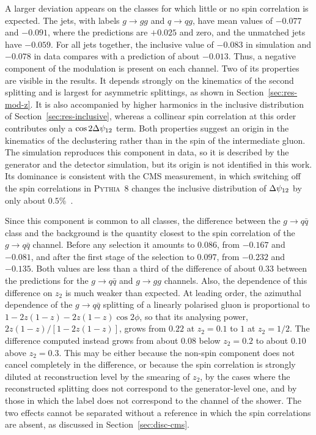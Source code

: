A larger deviation appears on the classes for which little or no spin correlation is expected.
The jets, with labels $g \to gg$ and $q \to qg$, have mean values of
$-0.077$ and $-0.091$, where the predictions are $+0.025$ and zero, and the
unmatched jets have $-0.059$. For all jets together, the inclusive value of
$-0.083$ in simulation and $-0.078$ in data compares with a prediction of about
$-0.013$. Thus, a negative component of the modulation is present on each channel.
Two of its properties are visible in the results.
It depends strongly on the kinematics of the second splitting and is largest for
asymmetric splittings, as shown in Section~\ref{sec:res-mod-z}. It is also
accompanied by higher harmonics in the inclusive distribution of
Section~\ref{sec:res-inclusive}, whereas a collinear spin correlation at this
order contributes only a $\cos 2\Delta\psi_{12}$ term. Both properties suggest an origin in
the kinematics of the declustering rather than in the spin of the intermediate
gluon. The simulation reproduces this component in data, so it is described by the
generator and the detector simulation, but its origin is not identified in this
work. Its dominance is consistent with the CMS measurement, in which switching off the
spin correlations in \textsc{Pythia}~8 changes the inclusive distribution of
$\Delta\psi_{12}$ by only about $0.5\%$~\cite{CMS:2026jnt}.

Since this component is common to all classes, the difference between the
$g \to q\bar{q}$ class and the background is the quantity closest to the spin
correlation of the $g \to q\bar{q}$ channel. Before any selection it amounts to
$0.086$, from $-0.167$ and $-0.081$, and after the first stage of the selection to
$0.097$, from $-0.232$ and $-0.135$. Both values are less than a third of the
difference of about $0.33$ between the predictions for the $g \to q\bar{q}$ and
$g \to gg$ channels. Also, the dependence of this difference on $z_2$ is much weaker
than expected. At leading order, the azimuthal dependence of the
$g \to q\bar{q}$ splitting of a linearly polarised gluon is proportional to
$1 - 2z(1-z) - 2z(1-z)\cos 2\phi$, so that its analysing power,
$2z(1-z)/[1 - 2z(1-z)]$, grows from $0.22$ at $z_2 = 0.1$ to $1$ at $z_2 = 1/2$.
The difference computed instead grows from about $0.08$ below $z_2 = 0.2$ to about
$0.10$ above $z_2 = 0.3$. This may be either because the non-spin
component does not cancel completely in the difference, or because the spin correlation
is strongly diluted at reconstruction level by the smearing of $z_2$,
by the cases where the reconstructed splitting does not correspond to the
generator-level one, and by those in which
the label does not correspond to the channel of the shower. 
The two effects cannot be separated without a reference in
which the spin correlations are absent, as discussed in
Section~\ref{sec:disc-cms}.

